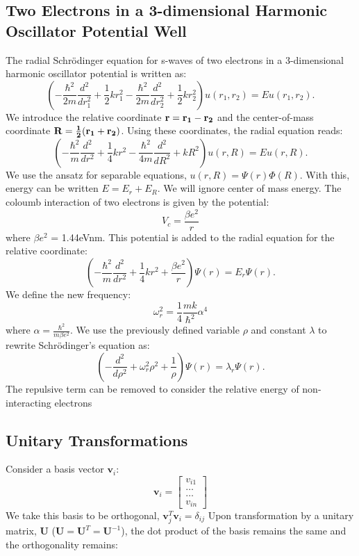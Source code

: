 \documentclass[10pt,showpacs,preprintnumbers,footinbib,amsmath,amssymb,aps,prl,twocolumn,groupedaddress,superscriptaddress,showkeys]{revtex4-1}
\begin{document}
\subsection{Two Electrons in a 3-dimensional Harmonic Oscillator Potential Well}
The radial Schr\"{o}dinger equation for s-waves of two electrons in a 3-dimensional harmonic oscillator potential is written as:
\begin{equation}
 \left(-\frac{\hbar^2}{2 m}  \frac{d^2}{dr^2_1}
     + \frac{1}{2}kr^2_1-\frac{\hbar^2}{2 m} \frac{d^2}{dr^2_2}
          + \frac{1}{2}kr^2_2\right) u(r_1,r_2) = E u(r_1,r_2).
\end{equation}
We introduce the relative coordinate $\bf{r} = \bf{r}_1-\bf{r}_2$ and the center-of-mass coordinate $\bf{R} = \frac{1}{2}(\bf{r}_1+\bf{r}_2)$. Using these coordinates, the radial equation reads:
\begin{equation}
 \left(-\frac{\hbar^2}{m}  \frac{d^2}{dr^2}
     + \frac{1}{4}kr^2-\frac{\hbar^2}{4 m} \frac{d^2}{dR^2}
          + kR^2\right) u(r,R) = E u(r,R).
\end{equation}
We use the ansatz for separable equations, $u(r,R) = \Psi(r)\Phi(R)$. With this, energy can be written $E = E_r + E_R$. We will ignore center of mass energy. The coloumb interaction of two electrons is given by the potential:
\begin{equation}
V_c = \frac{\beta e^2}{r}
\end{equation}
where $\beta e^2$ = 1.44eVnm. This potential is added to the radial equation for the relative coordinate:
\begin{equation}
 \left(-\frac{\hbar^2}{m}  \frac{d^2}{dr^2}
     + \frac{1}{4}kr^2+\frac{\beta e^2}{r}\right) \Psi(r) = E_r \Psi(r).
\end{equation}
We define the new frequency:
\begin{equation}
\omega_r^2 = \frac{1}{4}\frac{mk}{\hbar^2}\alpha^4
\end{equation}
where $\alpha = \frac{\hbar^2}{m\beta e^2}$. We use the previously defined variable $\rho$ and constant $\lambda$ to rewrite Schr\"{o}dinger's equation as:
\begin{equation}
 \left(-\frac{d^2}{d\rho^2}
     + \omega_r^2\rho^2+\frac{1}{\rho}\right) \Psi(r) = \lambda_r \Psi(r).
\end{equation}
The repulsive term can be removed to consider the relative energy of non-interacting electrons

\subsection{Unitary Transformations}
Consider a basis vector $\mathbf{v}_{i}$:
   \[
	\mathbf{v}_i = \begin{bmatrix} v_{i1} \\ \dots \\ \dots \\v_{in} \end{bmatrix}
	\]
We take this basis to be orthogonal, $\mathbf{v}^{T}_{j} \mathbf{v}_{i} = \delta_{ij}$
Upon transformation by a unitary matrix, $\mathbf{U}$ ($\mathbf{U} = \mathbf{U}^T = \mathbf{U}^{-1}$), the dot product of the basis remains the same and the orthogonality remains:
\end{document}
